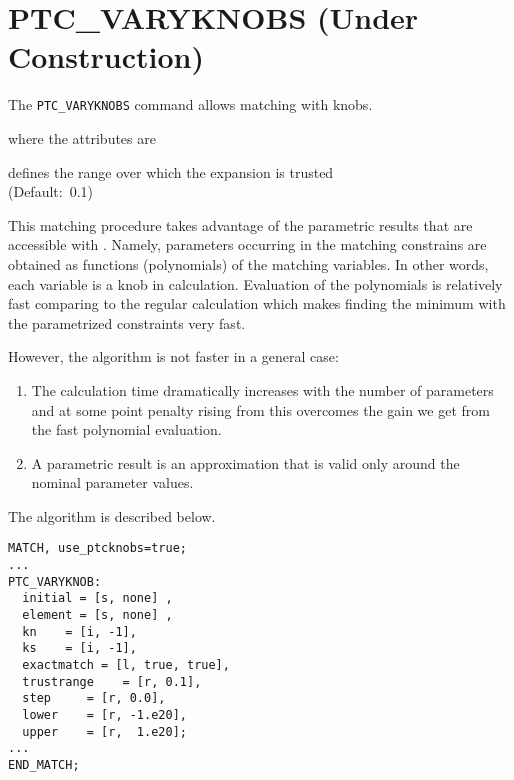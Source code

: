%


\section{PTC\_VARYKNOBS (Under Construction)}
\label{sec:ptc-varyknobs}

The \texttt{PTC\_VARYKNOBS} command allows matching with \ptc knobs.


where the attributes are
\begin{madlist}
   defines the range over which the expansion is
  trusted \\ (Default:~0.1)
\end{madlist}

This matching procedure takes advantage of the parametric results that
are accessible with \ptc. Namely, parameters occurring in the matching
constrains are obtained as functions (polynomials) of the matching
variables. In other words, each variable is a knob in \ptc
calculation. Evaluation of the polynomials is relatively fast comparing
to the regular \ptc calculation which makes finding the minimum with the
parametrized constraints very fast.

However, the algorithm is not faster in a general case:
\begin{enumerate}
   \item  The calculation time dramatically increases with the number of
     parameters and at some point penalty rising from this overcomes the
     gain we get from the fast polynomial evaluation.
   \item  A parametric result is an approximation that is valid only
     around the nominal parameter values.
\end{enumerate}

The algorithm is described below. \\

\begin{verbatim}
MATCH, use_ptcknobs=true;
...
PTC_VARYKNOB:
  initial = [s, none] ,
  element = [s, none] ,
  kn    = [i, -1],
  ks    = [i, -1],
  exactmatch = [l, true, true],
  trustrange    = [r, 0.1],
  step     = [r, 0.0],
  lower    = [r, -1.e20],
  upper    = [r,  1.e20];
...
END_MATCH;
\end{verbatim}

